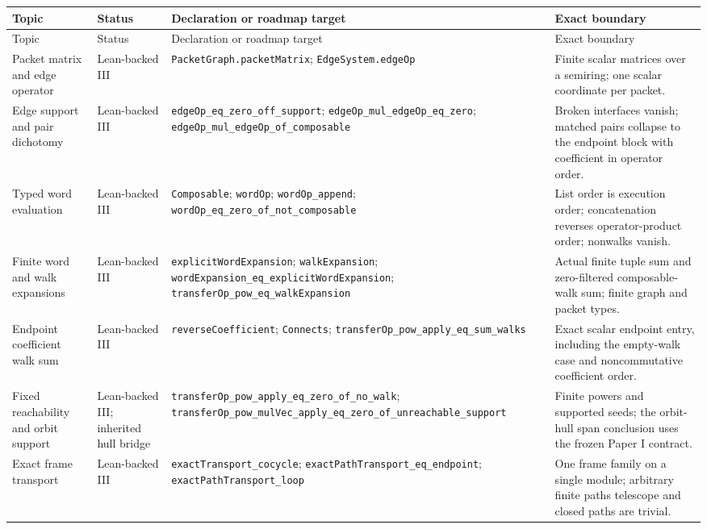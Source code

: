 \documentclass[11pt]{article}
\theoremstyle{definition}
\theoremstyle{remark}
\newcommand{\leanname}[1]{\nolinkurl{#1}}
\begin{document}
\small
\begin{longtable}{L{0.17\textwidth}L{0.18\textwidth}L{0.25\textwidth}L{0.22\textwidth}}
\toprule
Topic & Status & Declaration or roadmap target & Exact boundary\\
\midrule
\endfirsthead
\toprule
Topic & Status & Declaration or roadmap target & Exact boundary\\
\midrule
\endhead
Packet matrix and edge operator
& Lean-backed III
& \leanname{PacketGraph.packetMatrix}; \leanname{EdgeSystem.edgeOp}
& Finite scalar matrices over a semiring; one scalar coordinate per packet.\\
\addlinespace
Edge support and pair dichotomy
& Lean-backed III
& \leanname{edgeOp_eq_zero_off_support}; \leanname{edgeOp_mul_edgeOp_eq_zero}; \leanname{edgeOp_mul_edgeOp_of_composable}
& Broken interfaces vanish; matched pairs collapse to the endpoint block with coefficient in operator order.\\
\addlinespace
Typed word evaluation
& Lean-backed III
& \leanname{Composable}; \leanname{wordOp}; \leanname{wordOp_append}; \leanname{wordOp_eq_zero_of_not_composable}
& List order is execution order; concatenation reverses operator-product order; nonwalks vanish.\\
\addlinespace
Finite word and walk expansions
& Lean-backed III
& \leanname{explicitWordExpansion}; \leanname{walkExpansion}; \leanname{wordExpansion_eq_explicitWordExpansion}; \leanname{transferOp_pow_eq_walkExpansion}
& Actual finite tuple sum and zero-filtered composable-walk sum; finite graph and packet types.\\
\addlinespace
Endpoint coefficient walk sum
& Lean-backed III
& \leanname{reverseCoefficient}; \leanname{Connects}; \leanname{transferOp_pow_apply_eq_sum_walks}
& Exact scalar endpoint entry, including the empty-walk case and noncommutative coefficient order.\\
\addlinespace
Fixed reachability and orbit support
& Lean-backed III; inherited hull bridge
& \leanname{transferOp_pow_apply_eq_zero_of_no_walk}; \leanname{transferOp_pow_mulVec_apply_eq_zero_of_unreachable_support}
& Finite powers and supported seeds; the orbit-hull span conclusion uses the frozen Paper I contract.\\
\addlinespace
Exact frame transport
& Lean-backed III
& \leanname{exactTransport_cocycle}; \leanname{exactPathTransport_eq_endpoint}; \leanname{exactPathTransport_loop}
& One frame family on a single module; arbitrary finite paths telescope and closed paths are trivial.\\

\end{longtable}
\end{document}
